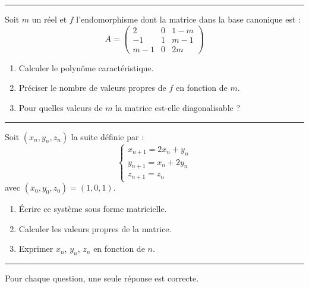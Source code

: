 \documentclass[../PolyS4.tex]{subfiles}
\begin{document}
\vspace{1em}
\hrule
\vspace{1em}


Soit $m$ un réel et $f$ l'endomorphisme dont la matrice dans la base canonique est :
$$A = \begin{pmatrix}
2 & 0 & 1-m \\
-1 & 1 & m-1 \\
m-1 & 0 & 2m
\end{pmatrix}$$
\begin{enumerate}
    \item Calculer le polynôme caractéristique.
    \item Préciser le nombre de valeurs propres de $f$ en fonction de $m$.
    \item Pour quelles valeurs de $m$ la matrice est-elle diagonalisable ?
\end{enumerate}

\vspace{1em}
\hrule
\vspace{1em}


Soit $(x_n, y_n, z_n)$ la suite définie par :
$$\begin{cases}
x_{n+1} = 2x_n + y_n \\
y_{n+1} = x_n + 2y_n \\
z_{n+1} = z_n
\end{cases}$$
avec $(x_0, y_0, z_0) = (1, 0, 1)$.
\begin{enumerate}
    \item Écrire ce système sous forme matricielle.
    \item Calculer les valeurs propres de la matrice.
    \item Exprimer $x_n$, $y_n$, $z_n$ en fonction de $n$.
\end{enumerate}

\vspace{1em}
\hrule
\vspace{1em}


Pour chaque question, une seule réponse est correcte.
\end{document}

